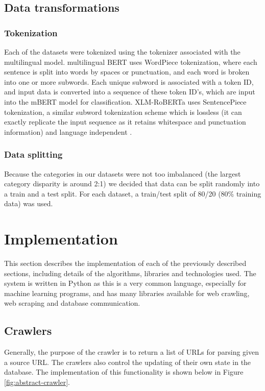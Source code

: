 \documentclass{l4proj}
\begin{document}
\section{Data transformations}
\subsection{Tokenization} \hfill \par 
Each of the datasets were tokenized using the tokenizer associated with the multilingual model. multilingual BERT uses WordPiece tokenization, where each sentence is split into words by spaces or punctuation, and each word is broken into one or more subwords. Each unique subword is associated with a token ID, and input data is converted into a sequence of these token ID's, which are input into the mBERT model for classification. XLM-RoBERTa uses SentencePiece tokenization, a similar subword tokenization scheme which is lossless (it can exactly replicate the input sequence as it retains whitespace and punctuation information) and language independent \citep{kudo2018sentencepiece}. 


\subsection{Data splitting} \hfill \par
Because the categories in our datasets were not too imbalanced (the largest category disparity is around 2:1) we decided that data can be split randomly into a train and a test split. For each dataset, a train/test split of 80/20 (80\% training data) was used.


\chapter{Implementation}
This section describes the implementation of each of the previously described sections, including details of the algorithms, libraries and technologies used. The system is written in Python as this is a very common language, especially for machine learning programs, and has many libraries available for web crawling, web scraping and database communication.

\section{Crawlers}
Generally, the purpose of the crawler is to return a list of URLs for parsing given a source URL. The crawlers also control the updating of their own state in the database. The implementation of this functionality is shown below in Figure \ref{fig:abstract-crawler}.
\end{document}
